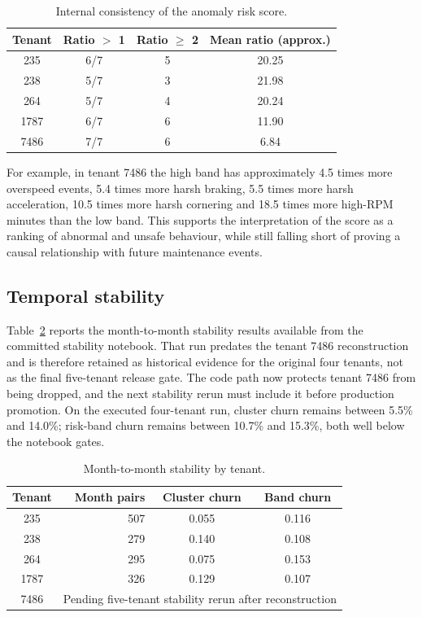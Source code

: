 \begin{table}[h]
\centering
\caption{Internal consistency of the anomaly risk score.}
\label{tab:risk-consistency}
\small
\begin{tabular}{|c|c|c|c|}
\hline
\textbf{Tenant} & \textbf{Ratio $>$ 1} & \textbf{Ratio $\geq$ 2} & \textbf{Mean ratio} (approx.) \\
\hline
235  & 6/7 & 5 & 20.25 \\
238  & 5/7 & 3 & 21.98 \\
264  & 5/7 & 4 & 20.24 \\
1787 & 6/7 & 6 & 11.90 \\
7486 & 7/7 & 6 & 6.84 \\
\hline
\end{tabular}
\end{table}

For example, in tenant 7486 the high band has approximately 4.5 times more overspeed events, 5.4 times more harsh braking, 5.5 times more harsh acceleration, 10.5 times more harsh cornering and 18.5 times more high-RPM minutes than the low band. This supports the interpretation of the score as a ranking of abnormal and unsafe behaviour, while still falling short of proving a causal relationship with future maintenance events.

\subsection{Temporal stability}
Table~\ref{tab:stability-eval} reports the month-to-month stability results available from the committed stability notebook. That run predates the tenant 7486 reconstruction and is therefore retained as historical evidence for the original four tenants, not as the final five-tenant release gate. The code path now protects tenant 7486 from being dropped, and the next stability rerun must include it before production promotion. On the executed four-tenant run, cluster churn remains between 5.5\% and 14.0\%; risk-band churn remains between 10.7\% and 15.3\%, both well below the notebook gates.

\begin{table}[h]
\centering
\caption{Month-to-month stability by tenant.}
\label{tab:stability-eval}
\begin{tabular}{|c|r|c|c|}
\hline
\textbf{Tenant} & \textbf{Month pairs} & \textbf{Cluster churn} & \textbf{Band churn} \\
\hline
235  & 507 & 0.055 & 0.116 \\
238  & 279 & 0.140 & 0.108 \\
264  & 295 & 0.075 & 0.153 \\
1787 & 326 & 0.129 & 0.107 \\
7486 & \multicolumn{3}{c|}{Pending five-tenant stability rerun after reconstruction} \\
\hline
\end{tabular}
\end{table}

